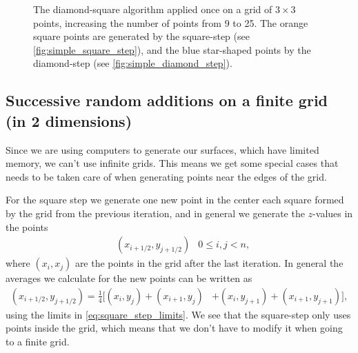 \begin{figure}
    \centering
    
    \caption{
        The diamond-square algorithm applied once on a grid of $3\times 3$ points, increasing the number of points from 9 to 25. The orange square points are generated by the square-step (see \cref{fig:simple_square_step}), and the blue star-shaped points by the diamond-step (see \cref{fig:simple_diamond_step}).
    }
    \label{fig:diamond_square_applied}
\end{figure}

\subsection{Successive random additions on a finite grid (in 2 dimensions)}
Since we are using computers to generate our surfaces, which have limited memory, we can't use infinite grids. This means we get some special cases that needs to be taken care of when generating points near the edges of the grid.

For the square step we generate one new point in the center each square formed by the grid from the previous iteration, and in general we generate the $z$-values in the points
\begin{align}
    &\left(x_{i+1/2}, y_{j+1/2}\right) &0\leq i,j < n, \label{eq:square_step_limits}
\end{align}
where $(x_i,x_j)$ are the points in the grid after the last iteration. In general the averages we calculate for the new points can be written as
\begin{align}
    (x_{i+1/2}, y_{j+1/2}) 
    = \frac{1}{4}\big[
        (x_i, y_j) + (x_{i+1}, y_j)
        &+ (x_i, y_{j+1}) + (x_{i+1}, y_{j+1})
    \big],
    \label{eq:square_step}
\end{align}
using the limits in \cref{eq:square_step_limits}. We see that the square-step only uses points inside the grid, which means that we don't have to modify it when going to a finite grid.

